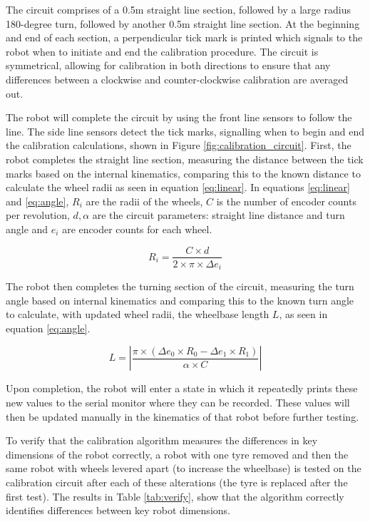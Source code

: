 \documentclass[conference]{IEEEtran}
\begin{document}
The circuit comprises of a 0.5m straight line section, followed by a large radius 180-degree turn, followed by another 0.5m straight line section. 
At the beginning and end of each section, a perpendicular tick mark is printed which signals to the robot when to initiate and end the calibration procedure. 
The circuit is symmetrical, allowing for calibration in both directions to ensure that any differences between a clockwise and counter-clockwise calibration are averaged out.

The robot will complete the circuit by using the front line sensors to follow the line. 
The side line sensors detect the tick marks, signalling when to begin and end the calibration calculations, shown in Figure \ref{fig:calibration_circuit}. 
First, the robot completes the straight line section, measuring the distance between the tick marks based on the internal kinematics, comparing this to the known distance to calculate the wheel radii as seen in equation \ref{eq:linear}. 
In equations \ref{eq:linear} and \ref{eq:angle}, $R_i$ are the radii of the wheels, $C$ is the number of encoder counts per revolution, $d,\alpha$ are the circuit parameters: straight line distance and turn angle and $e_i$ are encoder counts for each wheel.

\begin{equation}
\label{eq:linear}
    R_i = \frac{C \times d}{2 \times \pi \times \Delta e_i}
\end{equation}

The robot then completes the turning section of the circuit, measuring the turn angle based on internal kinematics and comparing this to the known turn angle to calculate, with updated wheel radii, the wheelbase length $L$, as seen in equation \ref{eq:angle}.

\begin{equation}
\label{eq:angle}
L = \left|\frac{\pi \times (\Delta e_0 \times R_0 - \Delta e_1 \times R_1)}{\alpha \times C}\right|
\end{equation}

Upon completion, the robot will enter a state in which it repeatedly prints these new values to the serial monitor where they can be recorded. These values will then be updated manually in the kinematics of that robot before further testing.

To verify that the calibration algorithm measures the differences in key dimensions of the robot correctly, a robot with one tyre removed and then the same robot with wheels levered apart (to increase the wheelbase) is tested on the calibration circuit after each of these alterations (the tyre is replaced after the first test). The results in Table \ref{tab:verify}, show that the algorithm correctly identifies differences between key robot dimensions.
\end{document}
